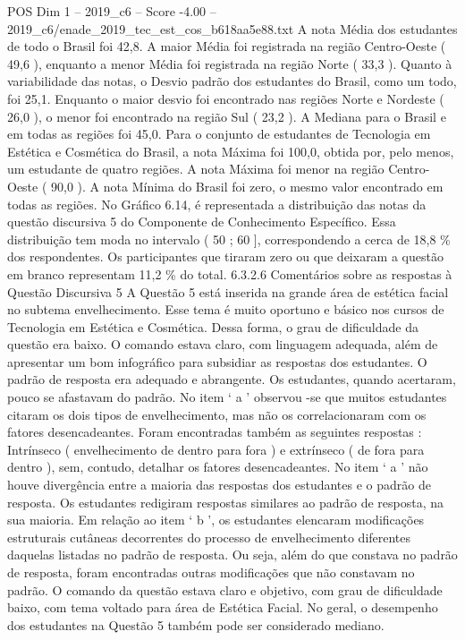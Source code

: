 \begin{textsample}{POS Dim 1 – 2019\_c6 – Score -4.00 – 2019\_c6/enade\_2019\_tec\_est\_cos\_b618aa5e88.txt}
A nota Média dos estudantes de todo o Brasil foi 42,8.
A maior Média foi registrada na região Centro-Oeste ( 49,6 ), enquanto a menor Média foi registrada na região Norte ( 33,3 ).
Quanto à variabilidade das notas, o Desvio padrão dos estudantes do Brasil, como um todo, foi 25,1.
Enquanto o maior desvio foi encontrado nas regiões Norte e Nordeste ( 26,0 ), o menor foi encontrado na região Sul ( 23,2 ).
A Mediana para o Brasil e em todas as regiões foi 45,0.
Para o conjunto de estudantes de Tecnologia em Estética e Cosmética do Brasil, a nota Máxima foi 100,0, obtida por, pelo menos, um estudante de quatro regiões.
A nota Máxima foi menor na região Centro-Oeste ( 90,0 ).
A nota Mínima do Brasil foi zero, o mesmo valor encontrado em todas as regiões.
No Gráfico 6.14, é representada a distribuição das notas da questão discursiva 5 do Componente de Conhecimento Específico.
Essa distribuição tem moda no intervalo ( 50 ; 60 ], correspondendo a cerca de 18,8 \% dos respondentes.
Os participantes que tiraram zero ou que deixaram a questão em branco representam 11,2 \% do total. 6.3.2.6 Comentários sobre as respostas à Questão Discursiva 5 A Questão 5 está inserida na grande área de estética facial no subtema envelhecimento.
Esse tema é muito oportuno e básico nos cursos de Tecnologia em Estética e Cosmética.
Dessa forma, o grau de dificuldade da questão era baixo.
O comando estava claro, com linguagem adequada, além de apresentar um bom infográfico para subsidiar as respostas dos estudantes.
O padrão de resposta era adequado e abrangente.
Os estudantes, quando acertaram, pouco se afastavam do padrão.
No item ‘ a ’ observou -se que muitos estudantes citaram os dois tipos de envelhecimento, mas não os correlacionaram com os fatores desencadeantes.
Foram encontradas também as seguintes respostas : Intrínseco ( envelhecimento de dentro para fora ) e extrínseco ( de fora para dentro ), sem, contudo, detalhar os fatores desencadeantes.
No item ‘ a ’ não houve divergência entre a maioria das respostas dos estudantes e o padrão de resposta.
Os estudantes redigiram respostas similares ao padrão de resposta, na sua maioria.
Em relação ao item ‘ b ’, os estudantes elencaram modificações estruturais cutâneas decorrentes do processo de envelhecimento diferentes daquelas listadas no padrão de resposta.
Ou seja, além do que constava no padrão de resposta, foram encontradas outras modificações que não constavam no padrão.
O comando da questão estava claro e objetivo, com grau de dificuldade baixo, com tema voltado para área de Estética Facial.
No geral, o desempenho dos estudantes na Questão 5 também pode ser considerado mediano.

\end{textsample}
